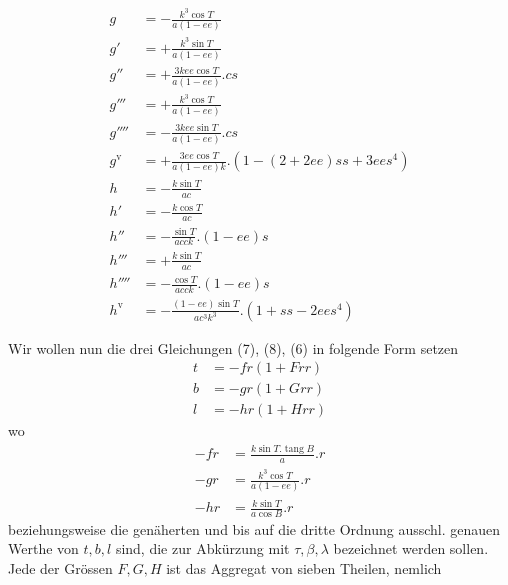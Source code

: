 %
\[
\begin{aligned}
g&=-\frac{k^3\cos T}{a(1-ee)}\\
g'&=+\frac{k^3\sin T}{a(1-ee)}\\
g''&=+\frac{3kee\cos T}{a(1-ee)}\mathord{.}cs\\
g'''&=+\frac{k^3\cos T}{a(1-ee)}\\
g''''&=-\frac{3kee\sin T}{a(1-ee)}\mathord{.}cs\\
g^{\mathrm{v}}&=+\frac{3ee\cos T}{a(1-ee)k}\mathord{.}(1-(2+2ee)ss+3ees^4)\\
h&=-\frac{k\sin T}{ac}\\
h'&=-\frac{k\cos T}{ac}\\
h''&=-\frac{\sin T}{acck}\mathord{.}(1-ee)s\\
h'''&=+\frac{k\sin T}{ac}\\
h''''&=-\frac{\cos T}{acck}\mathord{.}(1-ee)s\\
h^{\mathrm{v}}&=-\frac{(1-ee)\sin T}{ac^3k^3}\mathord{.}(1+ss-2ees^4)
\end{aligned}
\]

Wir wollen nun die drei Gleichungen (7), (8), (6) in folgende Form setzen
\[
\begin{aligned}
t&=-fr(1+Frr)\\
b&=-gr(1+Grr)\\
l&=-hr(1+Hrr)
\end{aligned}
\]
wo
\[
\begin{aligned}
-fr&=\frac{k\sin T\mathord{.}\operatorname{tang}B}{a}\mathord{.}r\\
-gr&=\frac{k^3\cos T}{a(1-ee)}\mathord{.}r\\
-hr&=\frac{k\sin T}{a\cos B}\mathord{.}r
\end{aligned}
\]
beziehungsweise die genäherten und bis auf die dritte Ordnung ausschl. genauen Werthe von \(t,b,l\) sind, die zur Abkürzung mit \(\tau,\beta,\lambda\) bezeichnet werden sollen. Jede der Grössen \(F,G,H\) ist das Aggregat von sieben Theilen, nemlich

